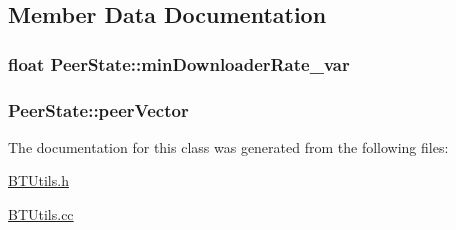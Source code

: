 \subsection{Member Data Documentation}
\hypertarget{classPeerState_afdaff8677c9f6ba7a3f3ef01a50e6853}{}
\subsubsection[{min\+Downloader\+Rate\+\_\+var}]{\setlength{\rightskip}{0pt plus 5cm}float Peer\+State\+::min\+Downloader\+Rate\+\_\+var\hspace{0.3cm}{\ttfamily [protected]}}\label{classPeerState_afdaff8677c9f6ba7a3f3ef01a50e6853}
\hypertarget{classPeerState_a378d9d144d96858759912cd003eade76}{}
\subsubsection[{peer\+Vector}]{ Peer\+State\+::peer\+Vector\hspace{0.3cm}{\ttfamily [protected]}}\label{classPeerState_a378d9d144d96858759912cd003eade76}


The documentation for this class was generated from the following files\+:\begin{DoxyCompactItemize}
\item 
\hyperlink{BTUtils_8h}{B\+T\+Utils.\+h}\item 
\hyperlink{BTUtils_8cc}{B\+T\+Utils.\+cc}\end{DoxyCompactItemize}
